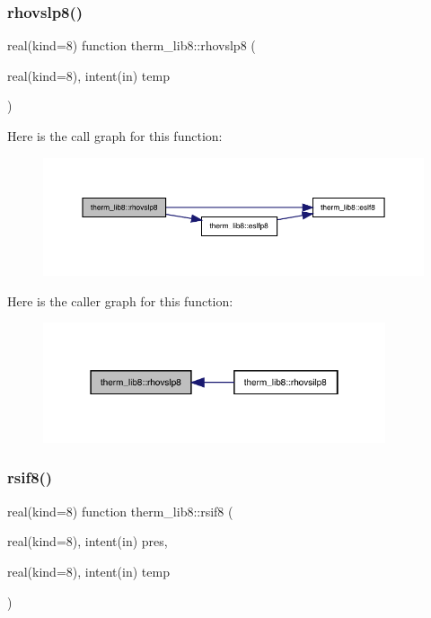 \subsubsection{\texorpdfstring{rhovslp8()}{rhovslp8()}}
{\footnotesize\ttfamily real(kind=8) function therm\+\_\+lib8\+::rhovslp8 (\begin{DoxyParamCaption}\item[{real(kind=8), intent(in)}]{temp }\end{DoxyParamCaption})}

Here is the call graph for this function\+:
\nopagebreak
\begin{figure}[H]
\begin{center}
\leavevmode
\includegraphics[width=350pt]{namespacetherm__lib8_a8f1e9b7f94a457d1972dc10825caefe3_cgraph}
\end{center}
\end{figure}
Here is the caller graph for this function\+:
\nopagebreak
\begin{figure}[H]
\begin{center}
\leavevmode
\includegraphics[width=286pt]{namespacetherm__lib8_a8f1e9b7f94a457d1972dc10825caefe3_icgraph}
\end{center}
\end{figure}
\mbox{\label{namespacetherm__lib8_a07814f1748b78bb1eb6f7cf12c6e2244}} 
\subsubsection{\texorpdfstring{rsif8()}{rsif8()}}
{\footnotesize\ttfamily real(kind=8) function therm\+\_\+lib8\+::rsif8 (\begin{DoxyParamCaption}\item[{real(kind=8), intent(in)}]{pres,  }\item[{real(kind=8), intent(in)}]{temp }\end{DoxyParamCaption})}

